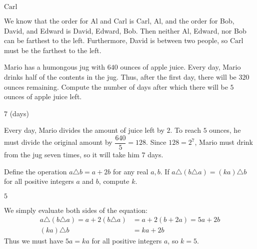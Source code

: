 \documentclass[11pt]{article}
\begin{document}
\begin{answer}
$\boxed{\text{Carl}}$
\end{answer}

\begin{solution}
We know that the order for Al and Carl is Carl, Al, and the order for Bob, David, and Edward is David, Edward, Bob. Then neither Al, Edward, nor Bob can be farthest to the left. Furthermore, David is between two people, so $\boxed{\text{Carl}}$ must be the farthest to the left. 
\end{solution}

\begin{problem}
Mario has a humongous jug with $640$ ounces of apple juice. Every day, Mario drinks half of the contents in the jug. Thus, after the first day, there will be $320$ ounces remaining. Compute the number of days after which there will be $5$ ounces of apple juice left.
\end{problem}

\begin{answer}
$\boxed{7}$ (days)
\end{answer}

\begin{solution}
Every day, Mario divides the amount of juice left by $2$. To reach $5$ ounces, he must divide the original amount by $\dfrac{640}{5} = 128$. Since $128 = 2^7$, Mario must drink from the jug seven times, so it will take him $\boxed{7}$ days. 
\end{solution}

\begin{problem}
Define the operation $a \triangle b = a + 2b$ for any real $a, b$. If $a \triangle (b \triangle a)  = (ka) \triangle b$ for all positive integers $a$ and $b$, compute $k$.
\end{problem}

\begin{answer}
$\boxed{5}$
\end{answer}

\begin{solution}
We simply evaluate  both sides of the equation: \begin{align*}a \triangle (b \triangle a) = a + 2(b \triangle a) &= a + 2(b + 2a) = 5a + 2b \\ (ka) \triangle b &= ka + 2b\end{align*} Thus we must have $5a = ka$ for all positive integers $a$, so $k = 5$.
\end{solution}
\end{document}
